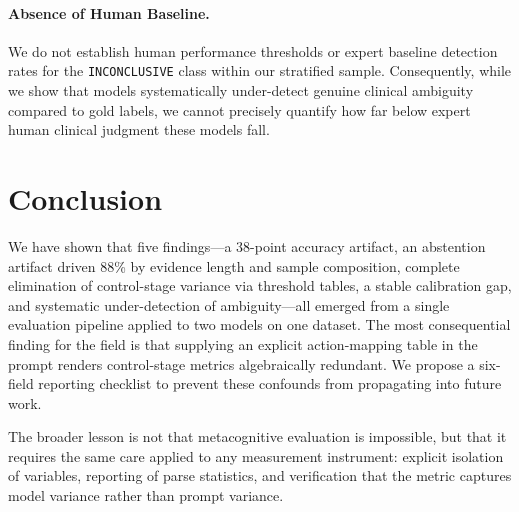 \documentclass[11pt]{article}
\begin{document}
\paragraph{Absence of Human Baseline.} We do not establish human performance thresholds or expert baseline detection rates for the \texttt{INCONCLUSIVE} class within our stratified sample. Consequently, while we show that models systematically under-detect genuine clinical ambiguity compared to gold labels, we cannot precisely quantify how far below expert human clinical judgment these models fall.

\section{Conclusion}

We have shown that five findings---a 38-point accuracy artifact, an abstention artifact driven 88\% by evidence length and sample composition, complete elimination of control-stage variance via threshold tables, a stable calibration gap, and systematic under-detection of ambiguity---all emerged from a single evaluation pipeline applied to two models on one dataset. The most consequential finding for the field is that supplying an explicit action-mapping table in the prompt renders control-stage metrics algebraically redundant. We propose a six-field reporting checklist to prevent these confounds from propagating into future work.

The broader lesson is not that metacognitive evaluation is impossible, but that it requires the same care applied to any measurement instrument: explicit isolation of variables, reporting of parse statistics, and verification that the metric captures model variance rather than prompt variance.


\end{document}
